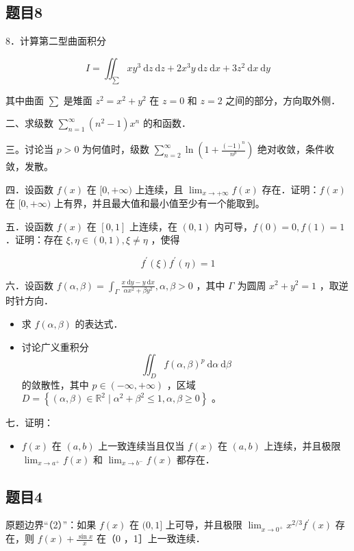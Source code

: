 \documentclass{article}
\begin{document}
\subsection{题目8}
8．计算第二型曲面积分

\[
I=\iint_{\sum} x y^{3} \mathrm{~d} z \mathrm{~d} z+2 x^{3} y \mathrm{~d} z \mathrm{~d} x+3 z^{2} \mathrm{~d} x \mathrm{~d} y
\]

其中曲面 \(\sum\) 是雉面 \(z^{2}=x^{2}+y^{2}\) 在 \(z=0\) 和 \(z=2\) 之间的部分，方向取外侧．

二、求级数 \(\sum_{n=1}^{\infty}\left(n^{2}-1\right) x^{n}\) 的和函数．

三。讨论当 \(p>0\) 为何值时，级数 \(\sum_{n=2}^{\infty} \ln \left(1+\frac{(-1)^{n}}{n^{p}}\right)\) 绝对收敛，条件收敛，发散。

四．设函数 \(f(x)\) 在 \([0,+\infty)\) 上连续，且 \(\lim _{x \rightarrow+\infty} f(x)\) 存在．证明：\(f(x)\) 在 \([0,+\infty)\) 上有界，并且最大值和最小值至少有一个能取到。

五．设函数 \(f(x)\) 在 \([0,1]\) 上连续，在 \((0,1)\) 内可导，\(f(0)=0, f(1)=1\) ．证明：存在 \(\xi, \eta \in(0,1), \xi \neq \eta\) ，使得

\[
f^{\prime}(\xi) f^{\prime}(\eta)=1
\]

六．设函数 \(f(\alpha, \beta)=\int_{\Gamma} \frac{x \mathrm{~d} y-y \mathrm{~d} x}{\alpha x^{2}+\beta y^{2}}, \alpha, \beta>0\) ，其中 \(\Gamma\) 为圆周 \(x^{2}+y^{2}=1\) ，取逆时针方向．

\begin{itemize}
  \item[（1）] 求 \(f(\alpha, \beta)\) 的表达式．
  \item[（2）] 讨论广义重积分
\[
\iint_{D} f(\alpha, \beta)^{p} \mathrm{~d} \alpha \mathrm{~d} \beta
\]
的敛散性，其中 \(p \in(-\infty,+\infty)\) ，区域 \(D=\left\{(\alpha, \beta) \in \mathbb{R}^{2} \mid \alpha^{2}+\beta^{2} \leq 1, \alpha, \beta \geq 0\right\}\) 。
\end{itemize}

七．证明：

\begin{itemize}
  \item[（1）] \(f(x)\) 在 \((a, b)\) 上一致连续当且仅当 \(f(x)\) 在 \((a, b)\) 上连续，并且极限 \(\lim _{x \rightarrow a^{+}} f(x)\) 和 \(\lim _{x \rightarrow b^{-}} f(x)\) 都存在．
\end{itemize}

\subsection{题目4}
原题边界“（2）”：如果 \(f(x)\) 在 \((0,1]\) 上可导，并且极限 \(\lim _{x \rightarrow 0^{+}} x^{2 / 3} f^{\prime}(x)\) 存在，则 \(f(x)+\frac{\sin x}{x}\) 在（0 ，1］上一致连续．
\end{document}
